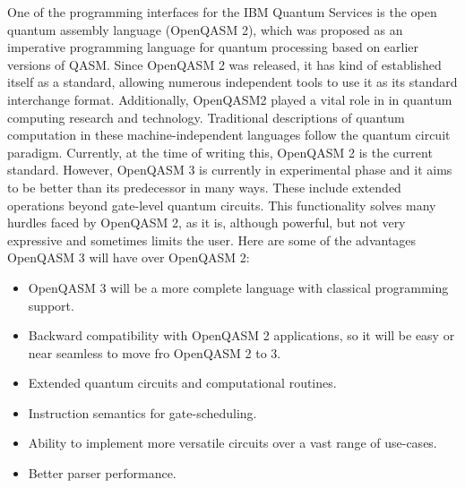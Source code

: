 \documentclass[conference]{IEEEtran}
\begin{document}
One of the programming interfaces for the IBM Quantum Services is the open quantum assembly language (OpenQASM 2), which was proposed as an imperative programming language for quantum processing based on earlier versions of QASM. Since OpenQASM 2 was released, it has kind of established itself as a standard, allowing numerous independent tools to use it as its standard interchange format. Additionally, OpenQASM2 played a vital role in in quantum computing research and technology. Traditional descriptions of quantum computation in these machine-independent languages follow the quantum circuit paradigm.\cite{b2} 
Currently, at the time of writing this, OpenQASM 2 is the current standard. However, OpenQASM 3 is currently in experimental phase and it aims to be better than its predecessor in many ways. These include extended operations beyond gate-level quantum circuits. This functionality solves many hurdles faced by OpenQASM 2, as it is, although powerful, but not very expressive and sometimes limits the user. \cite{b3}  Here are some of the advantages OpenQASM 3 will have over OpenQASM 2:

\begin{itemize}
\item  OpenQASM 3 will be a more complete language with classical programming support.
\item Backward compatibility with OpenQASM 2 applications, so it will be easy or near seamless to move fro OpenQASM 2 to 3. 
\item Extended quantum circuits and computational routines.
\item Instruction semantics for gate-scheduling.
\item Ability to implement more versatile circuits over a vast range of use-cases.
\item Better parser performance.
\end{itemize}
\end{document}
